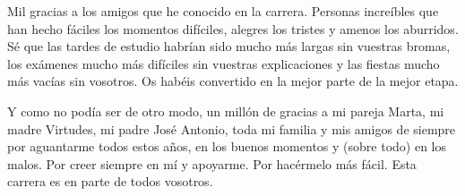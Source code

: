 Mil gracias a los amigos que he conocido en la carrera. Personas increíbles que han hecho fáciles los momentos difíciles, alegres los tristes y amenos los aburridos. Sé que las tardes de estudio habrían sido mucho más largas sin vuestras bromas, los exámenes mucho más difíciles sin vuestras explicaciones y las fiestas mucho más vacías sin vosotros. Os habéis convertido en la mejor parte de la mejor etapa.

Y como no podía ser de otro modo, un millón de gracias a mi pareja Marta, mi madre Virtudes, mi padre José Antonio, toda mi familia y mis amigos de siempre por aguantarme todos estos años, en los buenos momentos y (sobre todo) en los malos. Por creer siempre en mí y apoyarme. Por hacérmelo más fácil. Esta carrera es en parte de todos vosotros. 

